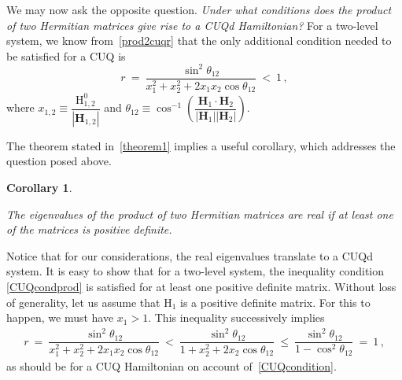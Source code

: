 \documentclass[12pt,a4paper]{article}
\newtheorem{corollary}{Corollary}[theorem]
\begin{document}
We may now ask the opposite question. {\em Under what conditions does the product of two Hermitian matrices give rise to a CUQd Hamiltonian?} For a two-level system, we know 
from~\eqref{prod2cuqr} that the only additional condition needed to be satisfied for a CUQ is
\begin{equation}
    r\: =\: \dfrac{\sin^2{\theta_{12}}}{x_1^2 + x_2^2 + 2x_1x_2 \cos{\theta_{12}}}\: <\: 1\,,\label{CUQcondprod}
\end{equation}
where $x_{1,2}\equiv \dfrac{\mathrm{H^0_{1,2}}}{|\mathbf{H}_{1,2}|}$ and $\theta_{12} \equiv \cos^{-1}\left({\dfrac{\mathbf{H}_{1}\cdot \mathbf{H}_{2}}{|\mathbf{H}_{1}||\mathbf{H}_{2}|}}\right)$. 

The theorem stated in~\ref{theorem1} implies a useful corollary, which addresses the question posed above.
\begin{corollary}
    \begin{shaded}
    The eigenvalues of the product of two Hermitian matrices are real if at least one of the matrices is positive definite\cite{Carlson1965OnRE}. 
\end{shaded}\label{corollary1}
\end{corollary}
Notice that for our considerations, the real eigenvalues translate to a CUQd system. It is easy to show that for a two-level system, the inequality condition \eqref{CUQcondprod} is satisfied for at least one positive definite matrix. Without loss of generality, let us assume that $\mathrm{H}_1$ is a positive definite matrix. For this to happen, we must have $x_1>1$. This inequality  successively implies
\begin{align}
r\: =\: \dfrac{\sin^2{\theta_{12}}}{x_1^2 + x_2^2 + 2x_1x_2 \cos{\theta_{12}}}\: <\: \dfrac{\sin^2{\theta_{12}}}{1 + x_2^2 + 2x_2 \cos{\theta_{12}}}\: \leq\: \dfrac{\sin^2{\theta_{12}}}{1 - \cos^2{\theta_{12}}}\: =\: 1\,,
\end{align}
as should be for a CUQ Hamiltonian on account of~\eqref{CUQcondition}.
\end{document}
